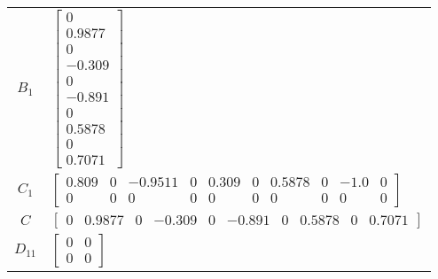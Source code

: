 \begin{tabular}{cl}
 $B_{1}$  & $\left[\begin{matrix}0\\0.9877\\0\\-0.309\\0\\-0.891\\0\\0.5878\\0\\0.7071\end{matrix}\right]$                                                                                                                                                                                                                                                                                                                                                                                                  \\
 $C_{1}$  & $\left[\begin{matrix}0.809 & 0 & -0.9511 & 0 & 0.309 & 0 & 0.5878 & 0 & -1.0 & 0\\0 & 0 & 0 & 0 & 0 & 0 & 0 & 0 & 0 & 0\end{matrix}\right]$                                                                                                                                                                                                                                                                                                                                                     \\
   $C$    & $\left[\begin{matrix}0 & 0.9877 & 0 & -0.309 & 0 & -0.891 & 0 & 0.5878 & 0 & 0.7071\end{matrix}\right]$                                                                                                                                                                                                                                                                                                                                                                                         \\
 $D_{11}$ & $\left[\begin{matrix}0 & 0\\0 & 0\end{matrix}\right]$                                                                                                                                                                                                                                                                                                                                                                                                                                           \\

\end{tabular}
